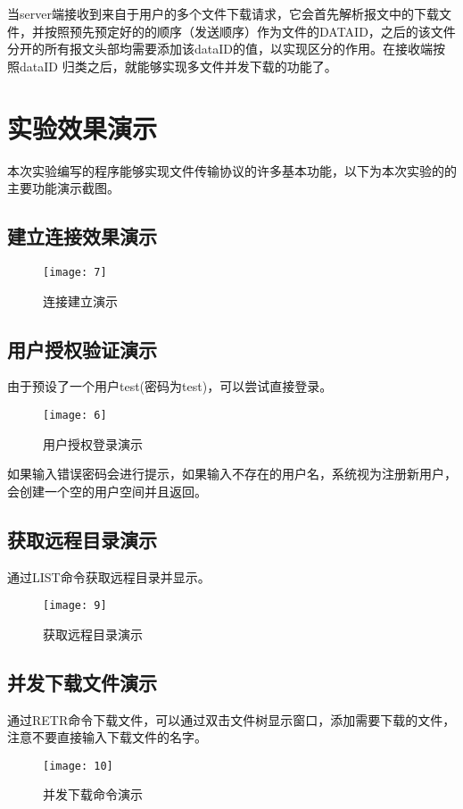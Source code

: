 \documentclass[lang=cn,11pt]{elegantpaper}
\begin{document}
当server端接收到来自于用户的多个文件下载请求，它会首先解析报文中的下载文件，并按照预先预定好的的顺序（发送顺序）作为文件的DATAID，之后的该文件分开的所有报文头部均需要添加该dataID的值，以实现区分的作用。在接收端按照dataID 归类之后，就能够实现多文件并发下载的功能了。


\section{实验效果演示}
 
本次实验编写的程序能够实现文件传输协议的许多基本功能，以下为本次实验的的主要功能演示截图。

\subsection{建立连接效果演示}

\begin{figure}[H]
	\centering
	\texttt{[image: 7]}
	\caption{连接建立演示\label{fig:7}}
\end{figure}


\subsection{用户授权验证演示}
由于预设了一个用户test(密码为test)，可以尝试直接登录。
\begin{figure}[H]
	\centering
	\texttt{[image: 6]}
	\caption{用户授权登录演示 \label{fig:6}}
\end{figure}
如果输入错误密码会进行提示，如果输入不存在的用户名，系统视为注册新用户，会创建一个空的用户空间并且返回。

\subsection{获取远程目录演示}
通过LIST命令获取远程目录并显示。
\begin{figure}[H]
	\centering
	\texttt{[image: 9]}
	\caption{获取远程目录演示 \label{fig:9}}
\end{figure}

\subsection{并发下载文件演示}
通过RETR命令下载文件，可以通过双击文件树显示窗口，添加需要下载的文件，注意不要直接输入下载文件的名字。

\begin{figure}[H]
	\centering
	\texttt{[image: 10]}
	\caption{并发下载命令演示 \label{fig:10}}
\end{figure}
\end{document}
